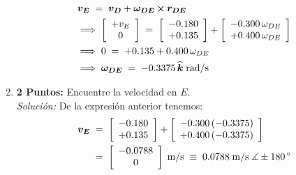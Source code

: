 \documentclass[ a4paper, twoside, 11pt]{article}
\begin{document}
\begin{problem}
\begin{enumerate}[label=\textbf{\alph*)}]
\begin{align*}
& {\boldsymbol{v_E}} \; = \; {\boldsymbol{v_D}} + {\boldsymbol{\omega_{DE}}} \,{\boldsymbol{\times}}\, {\boldsymbol{r_{DE}}} \\
& \Longrightarrow \; \left[ \begin{array}{c} +v_E \\ 0 \end{array} \right] \; = \; 
\left[ \begin{array}{c} -0.180 \\ +0.135 \end{array} \right] +
\left[ \begin{array}{c}  -0.300 \, \omega_{DE} \\  +0.400 \, \omega_{DE} \end{array} \right] \\
& \Longrightarrow \;
0 \; = \; +0.135 + 0.400 \, \omega_{DE} \\
& \Longrightarrow \;
{\boldsymbol{\omega_{DE}}} \; = \; -0.3375 \, {\boldsymbol{\widehat{k}}} \; \text{rad/s}
\end{align*}
\item \textbf{2 Puntos:} Encuentre la velocidad en $E$. \\[1ex] \emph{Soluci\'on:} De la expresi\'on anterior tenemos: 
\begin{align*}
{\boldsymbol{v_E}} \;
& = \; \left[ \begin{array}{c} -0.180 \\ +0.135 \end{array} \right] +
\left[ \begin{array}{c}  -0.300 \, (-0.3375) \\  +0.400 \, (-0.3375) \end{array} \right] \\
& = \; \left[ \begin{array}{c} -0.0788 \\ 0 \end{array} \right] \; \text{m/s} \; \equiv \;
0.0788 \; \text{m/s} \; \measuredangle \pm180^{\,\circ}
\end{align*}
\end{enumerate}
\QED

\end{problem}
\fullskip
\end{document}
